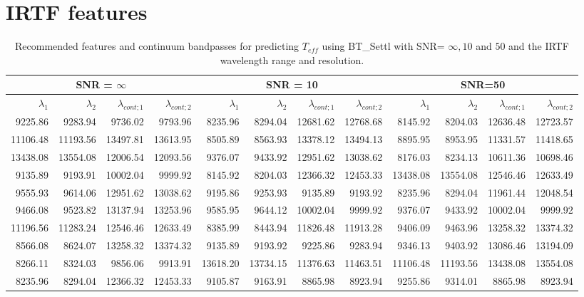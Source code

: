 
\section{IRTF features}
\label{app:features:irtf}


\begin{table*}
\begin{center}

  \begin{tabular}{rrrr | rrrr | rrrr }
  \hline
 \multicolumn{4}{c}{SNR = $\infty$ } & \multicolumn{4}{c}{SNR = 10} &  \multicolumn{4}{c}{SNR=50} \\
  \hline
$\lambda_1$ & $\lambda_2$ & $\lambda_{cont;1}$ & $\lambda_{cont;2} $ & $\lambda_1$ & $\lambda_2$ & $\lambda_{cont;1}$ & $\lambda_{cont;2} $ & $\lambda_1$ & $\lambda_2$ & $\lambda_{cont;1}$ & $\lambda_{cont;2} $ \\ 
  \hline
9225.86  & 9283.94   & 9736.02  & 9793.96  & 8235.96  & 8294.04   & 12681.62 & 12768.68   &  8145.92 & 8204.03   & 12636.48 & 12723.57 \\   
11106.48 & 11193.56  & 13497.81 & 13613.95 & 8505.89  & 8563.93   & 13378.12 & 13494.13   &  8895.95 & 8953.95   & 11331.57 & 11418.65 \\     
13438.08 & 13554.08  & 12006.54 & 12093.56 & 9376.07  & 9433.92   & 12951.62 & 13038.62   &  8176.03 & 8234.13   & 10611.36 & 10698.46 \\      
9135.89  & 9193.91   & 10002.04 & 9999.92  & 8145.92  & 8204.03   & 12366.32 & 12453.33   &  13438.08 & 13554.08 & 12546.46 & 12633.49 \\     
9555.93  & 9614.06   & 12951.62 & 13038.62 & 9195.86  & 9253.93   & 9135.89 & 9193.92     &  8235.96 & 8294.04   & 11961.44 & 12048.54 \\      
9466.08  & 9523.82   & 13137.94 & 13253.96 & 9585.95  & 9644.12   & 10002.04 & 9999.92    &  9376.07 & 9433.92   & 10002.04 & 9999.92  \\   
11196.56 & 11283.24  & 12546.46 & 12633.49 & 8385.99  & 8443.94   & 11826.48 & 11913.28   &  9406.09 & 9463.96   & 13258.32 & 13374.32 \\    
8566.08  & 8624.07   & 13258.32 & 13374.32 & 9135.89  & 9193.92   & 9225.86 & 9283.94     &  9346.13 & 9403.92   & 13086.46 & 13194.09 \\   
8266.11  & 8324.03   & 9856.06  & 9913.91  & 13618.20 & 13734.15  & 11376.63 & 11463.51   &  11106.48 & 11193.56 & 13438.08 & 13554.08 \\    
8235.96  & 8294.04   & 12366.32 & 12453.33 & 9105.87  & 9163.91   & 8865.98 & 8923.94     &  9255.86 & 9314.01   & 8865.98  & 8923.94  \\    
\hline
\end{tabular}
\caption {Recommended features and continuum bandpasses for predicting
  $ T_{eff} $ using BT\_Settl with SNR= $ \infty ,  10 $ and $50$ and the IRTF
  wavelength range and resolution.} \label{tab:irtf-teff-noisy}
\end{center}
\end{table*}


